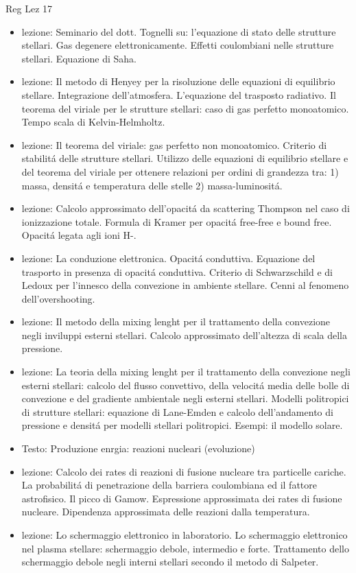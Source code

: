 \begin{frame}[allowframebreaks]{Reg Lez 17}
\begin{itemize}
\item lezione: Seminario del dott. Tognelli su: l'equazione di stato delle strutture stellari. Gas degenere elettronicamente. Effetti coulombiani nelle strutture stellari. Equazione di Saha.
\item lezione: Il metodo di Henyey per la risoluzione delle equazioni di equilibrio stellare. Integrazione dell'atmosfera. L'equazione del trasposto radiativo. Il teorema del viriale per le strutture stellari: caso di gas perfetto monoatomico. Tempo scala di Kelvin-Helmholtz.
\item lezione: Il teorema del viriale: gas perfetto non monoatomico. Criterio di stabilit\'a delle strutture stellari. Utilizzo delle equazioni di equilibrio stellare e del teorema del viriale per ottenere relazioni per ordini di grandezza tra: 1) massa, densit\'a e temperatura delle stelle 2) massa-luminosit\'a.
\item lezione: Calcolo approssimato dell'opacit\'a da scattering Thompson nel caso di ionizzazione totale. Formula di Kramer per opacit\'a free-free e bound free. Opacit\'a legata agli ioni H-.
\item lezione: La conduzione elettronica. Opacit\'a conduttiva. Equazione del trasporto in presenza di opacit\'a conduttiva. Criterio di Schwarzschild e di Ledoux per l'innesco della convezione in ambiente stellare. Cenni al fenomeno dell'overshooting.
\item lezione: Il metodo della mixing lenght per il trattamento della convezione negli inviluppi esterni stellari. Calcolo approssimato dell'altezza di scala della pressione. 
\item lezione: La teoria della mixing lenght per il trattamento della convezione negli esterni stellari: calcolo del flusso convettivo, della velocit\'a media delle bolle di convezione e del gradiente ambientale negli esterni stellari. Modelli politropici di strutture stellari: equazione di Lane-Emden e calcolo dell'andamento di pressione e densit\'a per modelli stellari politropici. Esempi: il modello solare.
\item Testo: Produzione enrgia: reazioni nucleari (evoluzione)
\item lezione: Calcolo dei rates di reazioni di fusione nucleare tra particelle cariche. La probabilit\'a di penetrazione della barriera coulombiana ed il fattore astrofisico. Il picco di Gamow. Espressione approssimata dei rates di fusione nucleare. Dipendenza approssimata delle reazioni dalla temperatura.
\item lezione: Lo schermaggio elettronico in laboratorio. Lo schermaggio elettronico nel plasma stellare: schermaggio debole, intermedio e forte. Trattamento dello schermaggio debole negli interni stellari secondo il metodo di Salpeter. 

\end{itemize}
\end{frame}
